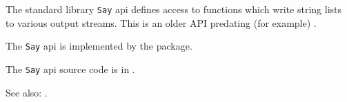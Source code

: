 
The standard library {\tt Say} api defines access to functions which write string lists 
to various output streams.  This is an older API predating (for example) .

The {\tt Say} api is implemented by the  package.

The {\tt Say} api source code is in .

See also:  .
